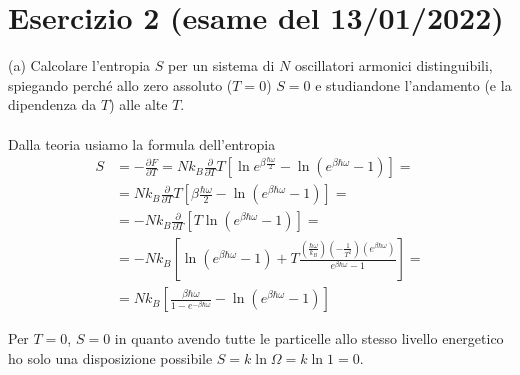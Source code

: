 \documentclass[a4paper]{article}
\begin{document}
    \section*{Esercizio 2 (esame del 13/01/2022)}
        (a) Calcolare l'entropia $S$ per un sistema di $N$ oscillatori armonici distinguibili, spiegando perch\'e allo zero assoluto ($T = 0$) $S = 0$ e studiandone l'andamento (e la dipendenza da $T$) alle alte $T$.
        \\
        \\
        Dalla teoria usiamo la formula dell'entropia
        \begin{equation*}
            \begin{split}
                S&=-\frac{\partial F}{\partial T}=Nk_B\frac{\partial}{\partial T}T\left[\ln e^{\beta\frac{\hbar\omega}{2}}-\ln (e^{\beta\hbar\omega}-1)\right]=\\
                &=Nk_B\frac{\partial}{\partial T}T\left[\beta\frac{\hbar\omega}{2}-\ln (e^{\beta\hbar\omega}-1)\right]=\\
                &=-Nk_B\frac{\partial}{\partial T}\left[T\ln (e^{\beta\hbar\omega}-1)\right]=\\
                &=-Nk_B\left[\ln (e^{\beta\hbar\omega}-1)+T\frac{\left(\frac{\hbar\omega}{k_B}\right)\left(-\frac{1}{T^2}\right)(e^{\beta\hbar\omega})}{e^{\beta\hbar\omega}-1}\right]=\\
                &=Nk_B\left[\frac{\beta\hbar\omega}{1-e^{-\beta\hbar\omega}}-\ln (e^{\beta\hbar\omega}-1)\right]             
            \end{split}
        \end{equation*}
        \begin{center}
        \end{center}
        Per $T = 0$, $S = 0$ in quanto avendo tutte le particelle allo stesso livello energetico ho solo una disposizione possibile $S=k\ln\Omega=k\ln 1=0$.
\end{document}
